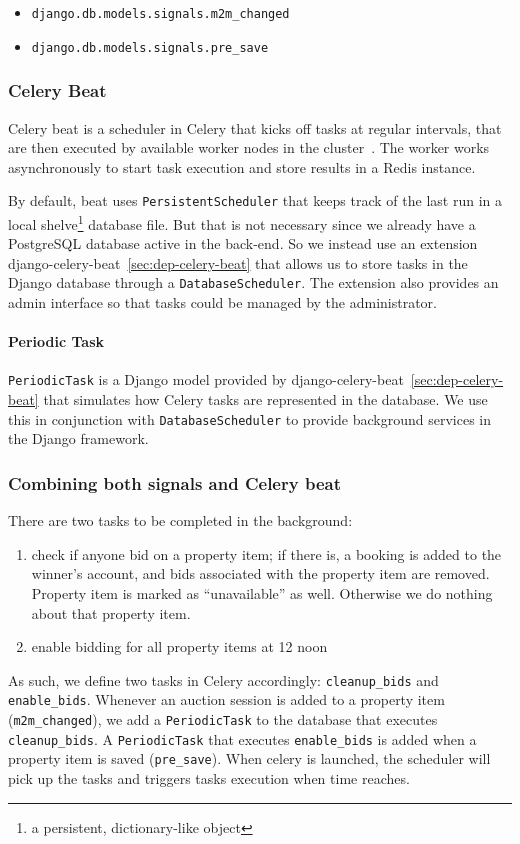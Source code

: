 \begin{itemize}
  \item \texttt{django.db.models.signals.m2m\_changed}
  \item \texttt{django.db.models.signals.pre\_save}
\end{itemize}

\subsubsection{Celery Beat}
Celery beat is a scheduler in Celery that kicks off tasks at regular intervals,
that are then executed by available worker nodes in the cluster~\parencite{celery-beat}.
The worker works asynchronously to start task execution and store results in
a Redis instance.

By default, beat uses \texttt{PersistentScheduler} that keeps track of the last
run in a local shelve\footnote{a persistent, dictionary-like object} database
file. But that is not necessary since we already have a PostgreSQL database
active in the back-end. So we instead use an extension
django-celery-beat~\ref{sec:dep-celery-beat} that allows us to store tasks in
the Django database through a \texttt{DatabaseScheduler}. The extension also
provides an admin interface so that tasks could be managed by the administrator.

\paragraph{Periodic Task}
\texttt{PeriodicTask} is a Django model provided by
django-celery-beat~\ref{sec:dep-celery-beat} that simulates how Celery tasks are
represented in the database. We use this in conjunction with
\texttt{DatabaseScheduler} to provide background services in the Django
framework.

\subsubsection{Combining both signals and Celery beat}
There are two tasks to be completed in the background:
\begin{enumerate}
  \item check if anyone bid on a property item; if there is, a booking is added
    to the winner's account, and bids associated with the property item are
    removed. Property item is marked as ``unavailable'' as well. Otherwise we do
    nothing about that property item.
  \item enable bidding for all property items at 12 noon
\end{enumerate}
As such, we define two tasks in Celery accordingly: \texttt{cleanup\_bids} and
\texttt{enable\_bids}. Whenever an auction session is added to a property item
(\texttt{m2m\_changed}), we add a \texttt{PeriodicTask} to the database that
executes \texttt{cleanup\_bids}. A \texttt{PeriodicTask} that executes
\texttt{enable\_bids} is added when a property item is
saved (\texttt{pre\_save}). When celery is launched, the scheduler will pick up
the tasks and triggers tasks execution when time reaches.
